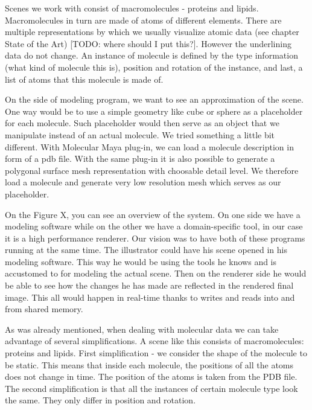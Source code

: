 \documentclass[
  digital, %
  table,   %
  nolof,     %
  nolot,     %
]{fithesis3}
\begin{document}
Scenes we work with consist of macromolecules - proteins and lipids. Macromolecules in turn are made of atoms of different elements. There are multiple representations by which we usually visualize atomic data (see chapter State of the Art) [TODO: where should I put this?]. However the underlining data do not change. An instance of molecule is defined by the type information (what kind of molecule this is), position and rotation of the instance, and last, a list of atoms that this molecule is made of.

On the side of modeling program, we want to see an approximation of the scene. One way would be to use a simple geometry like cube or sphere as a placeholder for each molecule. Such placeholder would then serve as an object that we manipulate instead of an actual molecule. We tried something a little bit different. With Molecular Maya plug-in, we can load a molecule description in form of a pdb file. With the same plug-in it is also possible to generate a polygonal surface mesh representation with choosable detail level. We therefore load a molecule and generate very low resolution mesh which serves as our placeholder.

On the Figure X, you can see an overview of the system. On one side we have a modeling software while on the other we have a domain-specific tool, in our case it is a high performance renderer. Our vision was to have both of these programs running at the same time. The illustrator could have his scene opened in his modeling software. This way he would be using the tools he knows and is accustomed to for modeling the actual scene. Then on the renderer side he would be able to see how the changes he has made are reflected in the rendered final image. This all would happen in real-time thanks to writes and reads into and from shared memory.

As was already mentioned, when dealing with molecular data we can take advantage of several simplifications. A scene like this consists of macromolecules: proteins and lipids. First simplification - we consider the shape of the molecule to be static. This means that inside each molecule, the positions of all the atoms does not change in time. The position of the atoms is taken from the PDB file. The second simplification is that all the instances of certain molecule type look the same. They only differ in position and rotation.
\end{document}

